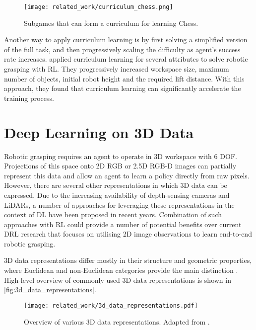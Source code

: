\begin{figure}[ht]
    \centering
    \texttt{[image: related\_work/curriculum\_chess.png]}
    \caption{Subgames that can form a curriculum for learning Chess. \protect\cite{narvekar_curriculum_2020}}
    \label{fig:curriculum_chess}
\end{figure}

Another way to apply curriculum learning is by first solving a simplified version of the full task, and then progressively scaling the difficulty as agent's success rate increases. \citet{breyer_comparing_2019} applied curriculum learning for several attributes to solve robotic grasping with RL. They progressively increased workspace size, maximum number of objects, initial robot height and the required lift distance. With this approach, they found that curriculum learning can significantly accelerate the training process.


\section{Deep Learning on 3D Data}

Robotic grasping requires an agent to operate in 3D workspace with 6 DOF. Projections of this space onto 2D RGB or 2.5D RGB-D images can partially represent this data and allow an agent to learn a policy directly from raw pixels. However, there are several other representations in which 3D data can be expressed. Due to the increasing availability of depth-sensing cameras and LiDARs, a number of approaches for leveraging these representations in the context of DL have been proposed in recent years. Combination of such approaches with RL could provide a number of potential benefits over current DRL research that focuses on utilising 2D image observations to learn end-to-end robotic grasping.

3D data representations differ mostly in their structure and geometric properties, where Euclidean and non-Euclidean categories provide the main distinction \cite{ahmed_deep_2018}. High-level overview of commonly used 3D data representations is shown in \autoref{fig:3d_data_representations}.

\begin{figure}[ht]
    \centering
    \texttt{[image: related\_work/3d\_data\_representations.pdf]}
    \caption{Overview of various 3D data representations. Adapted from \protect\citet{ahmed_deep_2018}.}
    \label{fig:3d_data_representations}
\end{figure}



